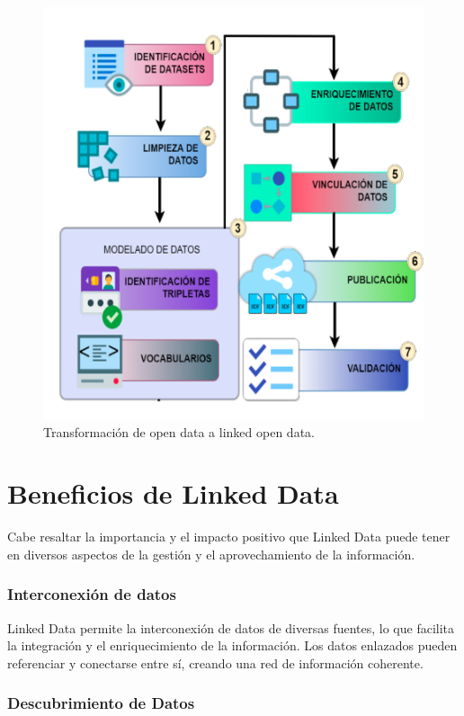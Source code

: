 \documentclass[11pt]{report}
\begin{document}
		\begin{figure}[H]
			\centering
			\includegraphics[scale=0.09]{../img/od-lod1.png} %
			\caption{Transformación de open data a linked open data.}
			\label{fig:od->lod}
		\end{figure}
\chapter{Beneficios de Linked Data}
Cabe resaltar la importancia y el impacto positivo que Linked Data puede tener en diversos aspectos de la gestión y el aprovechamiento de la información.
\subsection*{Interconexión de datos}

		Linked Data permite la interconexión de datos de diversas fuentes, lo que facilita la integración y el enriquecimiento de la información. Los datos enlazados pueden referenciar y conectarse entre sí, creando una red de información coherente.
\subsection*{Descubrimiento de Datos}
\end{document}

